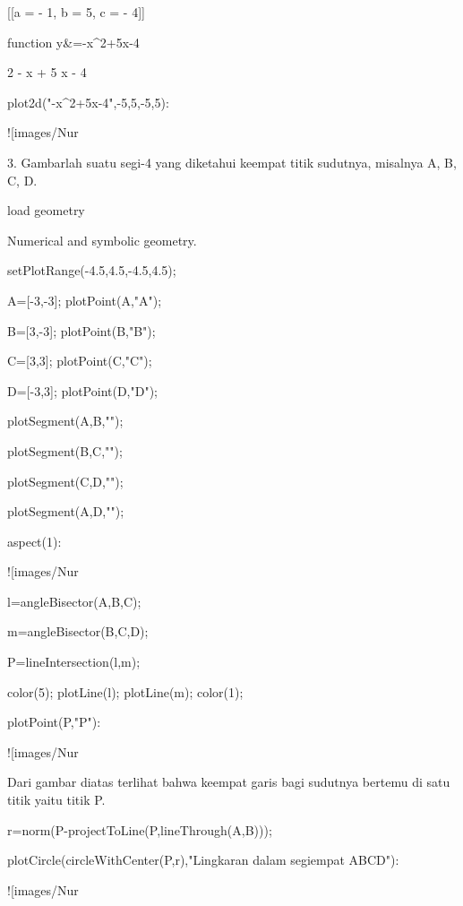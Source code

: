 \documentclass{article}
\begin{document}
    
                         [[a = - 1, b = 5, c = - 4]]
    

\>function y&=-x^2+5\*x-4


    
                                   2
                                - x  + 5 x - 4
    

\>plot2d("-x^2+5\*x-4",-5,5,-5,5):


![images/Nur%

3. Gambarlah suatu segi-4 yang diketahui keempat titik sudutnya,
misalnya A, B, C, D.


\>load geometry


    Numerical and symbolic geometry.

\>setPlotRange(-4.5,4.5,-4.5,4.5);

\>A=[-3,-3]; plotPoint(A,"A");

\>B=[3,-3]; plotPoint(B,"B");

\>C=[3,3]; plotPoint(C,"C");

\>D=[-3,3]; plotPoint(D,"D");

\>plotSegment(A,B,"");

\>plotSegment(B,C,"");

\>plotSegment(C,D,"");

\>plotSegment(A,D,"");

\>aspect(1):


![images/Nur%

\>l=angleBisector(A,B,C);

\>m=angleBisector(B,C,D);

\>P=lineIntersection(l,m);

\>color(5); plotLine(l); plotLine(m); color(1);

\>plotPoint(P,"P"):


![images/Nur%

Dari gambar diatas terlihat bahwa keempat garis bagi sudutnya bertemu
di satu titik yaitu titik P.


\>r=norm(P-projectToLine(P,lineThrough(A,B)));

\>plotCircle(circleWithCenter(P,r),"Lingkaran dalam segiempat ABCD"):


![images/Nur%
\end{document}
